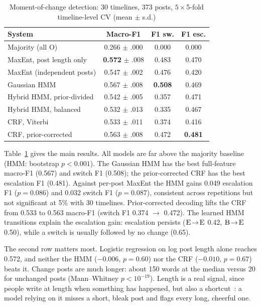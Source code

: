 \documentclass[conference]{IEEEtran}
\newcommand{\state}[1]{\textsc{#1}}
\begin{document}
\begin{table}[t]
\caption{Moment-of-change detection: 30 timelines, 373 posts, $5\times$5-fold timeline-level CV (mean $\pm$ s.d.)}
\label{tab:main}
\centering\footnotesize
\begin{tabular}{@{}lccc@{}}
\toprule
System & Macro-F1 & F1 sw. & F1 esc. \\
\midrule
Majority (all \state{O}) & 0.266 $\pm$ .000 & 0.000 & 0.000 \\
MaxEnt, post length only & \textbf{0.572} $\pm$ .008 & 0.483 & 0.470 \\
\midrule
MaxEnt (independent posts) & 0.547 $\pm$ .002 & 0.476 & 0.420 \\
Gaussian HMM & 0.567 $\pm$ .008 & \textbf{0.508} & 0.469 \\
Hybrid HMM, prior-divided & 0.542 $\pm$ .005 & 0.357 & 0.471 \\
Hybrid HMM, balanced & 0.532 $\pm$ .013 & 0.335 & 0.467 \\
CRF, Viterbi & 0.533 $\pm$ .011 & 0.374 & 0.416 \\
CRF, prior-corrected & 0.563 $\pm$ .008 & 0.472 & \textbf{0.481} \\
\bottomrule
\end{tabular}
\end{table}

Table~\ref{tab:main} gives the main results. All models are far above the majority baseline (HMM: bootstrap $p < 0.001$). The Gaussian HMM has the best full-feature macro-F1 (0.567) and switch F1 (0.508); the prior-corrected CRF has the best escalation F1 (0.481). Against per-post MaxEnt the HMM gains 0.049 escalation F1 ($p = 0.086$) and 0.032 switch F1 ($p = 0.087$), consistent across repetitions but not significant at 5\% with 30 timelines. Prior-corrected decoding lifts the CRF from 0.533 to 0.563 macro-F1 (switch F1 0.374 $\rightarrow$ 0.472). The learned HMM transitions explain the escalation gain: escalation persists ($\state{E}\!\to\!\state{E}$ 0.42, $\state{B}\!\to\!\state{E}$ 0.50), while a switch is usually followed by no change (0.65).

The second row matters most. Logistic regression on log post length alone reaches 0.572, and neither the HMM ($-0.006$, $p = 0.60$) nor the CRF ($-0.010$, $p = 0.67$) beats it. Change posts are much longer: about 150 words at the median versus 20 for unchanged posts (Mann--Whitney $p < 10^{-19}$). Length is a real signal, since people write at length when something has happened, but also a shortcut~\cite{geirhos2020shortcut}: a model relying on it misses a short, bleak post and flags every long, cheerful one.
\end{document}
